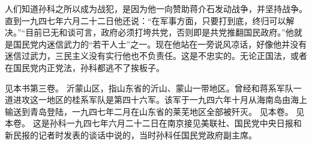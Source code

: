 人们知道孙科之所以成为战犯，是因为他一向赞助蒋介石发动战争，并坚持战争。直到一九四七年六月二十二日他还说：“在军事方面，只要打到底，终归可以解决。”“目前已无和谈可言，政府必须打垮共党，否则即是共党推翻国民政府。”他就是国民党内迷信武力的“若干人士”之一。现在他站在一旁说风凉话，好像他并没有迷信过武力，三民主义没有实行他也不负责任。这是不忠实的。无论正国法，或者在国民党内正党法，孙科都逃不了挨板子。


\begin{maonote}
见本书第三卷。
沂蒙山区，指山东省的沂山、蒙山一带地区。曾经和蒋系军队一道进攻这一地区的桂系军队是第四十六军。该军于一九四六年十月从海南岛由海上输送到青岛登陆，一九四七年二月在山东省的莱芜地区全部被歼灭。
见本卷。
见本卷。
这是孙科一九四七年六月二十二日在南京接见美联社、国民党中央日报和新民报的记者时发表的谈话中说的，当时孙科任国民党政府副主席。
\end{maonote}
